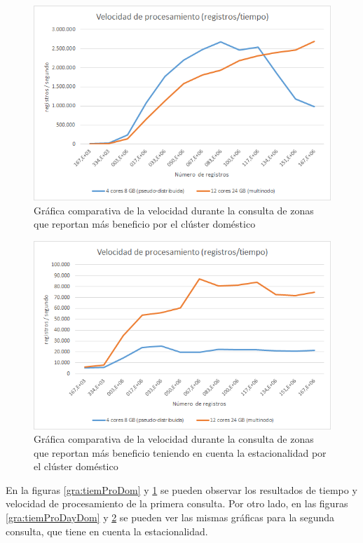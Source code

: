 \begin{figure}[htp!]
	\centering
	\caption{Gráfica comparativa de la velocidad durante la consulta de zonas que reportan más beneficio por el clúster doméstico}
	\label{gra:velProDom}
	\vspace{5pt}
	\includegraphics[scale=0.9]{graficas/vbdom}
\end{figure}
\begin{figure}[htp!]
	\centering
	\caption{Gráfica comparativa de la velocidad durante la consulta de zonas que reportan más beneficio teniendo en cuenta la estacionalidad por el clúster doméstico}
	\label{gra:velProDayDom}
	\vspace{5pt}
	\includegraphics[scale=0.9]{graficas/vbddom}
\end{figure}

En la figuras \ref{gra:tiemProDom} y \ref{gra:velProDom} se pueden observar los resultados de tiempo y velocidad de procesamiento de la primera consulta. Por otro lado, en las figuras \ref{gra:tiemProDayDom} y \ref{gra:velProDayDom} se pueden ver las mismas gráficas para la segunda consulta, que tiene en cuenta la estacionalidad.

